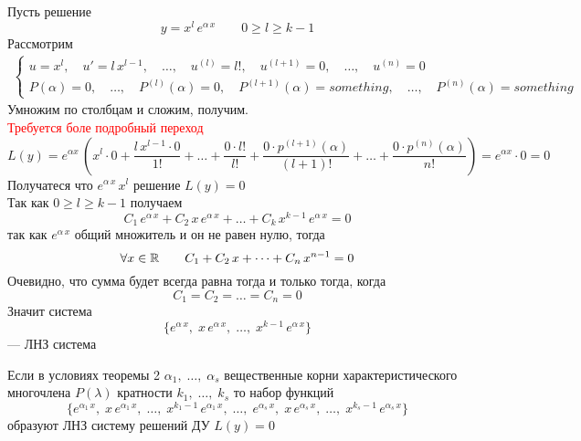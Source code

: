 \begin{Proof}
    Пусть решение
    \[
        y=x^l\,e^{\alpha\,x} \qquad 0 \geqslant l \geqslant k-1
    \]
    Рассмотрим
    \begin{align*}
        \begin{cases}
            u=x^l,\quad u'=l\,x^{l-1},\quad \dots,\quad u^{(l)}=l!,\quad u^{(l+1)}=0,\quad \dots,\quad u^{(n)}=0\\
            P(\alpha)=0,\quad \dots,\quad P^{(l)}(\alpha)=0,\quad P^{(l+1)}(\alpha)=something,\quad \dots,\quad P^{(n)}(\alpha)=something
        \end{cases}
    \end{align*}
    Умножим по столбцам и сложим, получим.\\
    \textcolor{red}{Требуется боле подробный переход}
    \[
        L(y)= e^{\alpha x}\,(x^l\cdot 0+\frac{l\,x^{l-1}\cdot0}{1!}+\dots+\frac{0\cdot l!}{l!}+\frac{0\cdot p^{(l+1)}(\alpha)}{(l+1)!}+ \dots + \frac{0\cdot p^{(n)}(\alpha)}{n!})=e^{\alpha x}\cdot 0=0
    \]
    Получатеся что $e^{\alpha\,x}\,x^l$ решение $L(y)=0$\\
    Так как $0 \geqslant l \geqslant k-1$ получаем
    \[
        C_1\,e^{\alpha\,x}+C_2\,x\,e^{\alpha\,x}+\dots+C_k\,x^{k-1}\,e^{\alpha\,x}=0
    \]
    так как $e^{\alpha\,x}$ общий множитель и он не равен нулю, тогда
    \[
        \forall x \in \mathbb{R} \qquad C_1+C_2\,x+\dots+C_n\,x^{n-1}=0
    \]
    Очевидно, что сумма будет всегда равна тогда и только тогда, когда
    \[
        C_1=C_2=\dots=C_n=0
    \]
    Значит система
    \[
        \{e^{\alpha\,x},\; x\,e^{\alpha\,x},\; \dots,\; x^{k-1}\,e^{\alpha\,x}\}
    \] 
    --- ЛНЗ система
\end{Proof}

\begin{Th}
    Если в условиях теоремы 2 $\alpha_1,\; \dots,\; \alpha_s$ вещественные корни характеристического многочлена $P(\lambda)$ кратности $k_1,\; \dots,\; k_s$ то набор функций
    \[
        \{e^{\alpha_1\,x},\; x\,e^{\alpha_1\,x},\; \dots,\; x^{k_1-1}\,e^{\alpha_1\,x},\; \dots,\; e^{\alpha_s\,x},\; x\,e^{\alpha_s\,x},\; \dots,\; x^{k_s-1}\,e^{\alpha_s\,x}\}
    \]
    образуют ЛНЗ систему решений ДУ $L(y)=0$
\end{Th}

